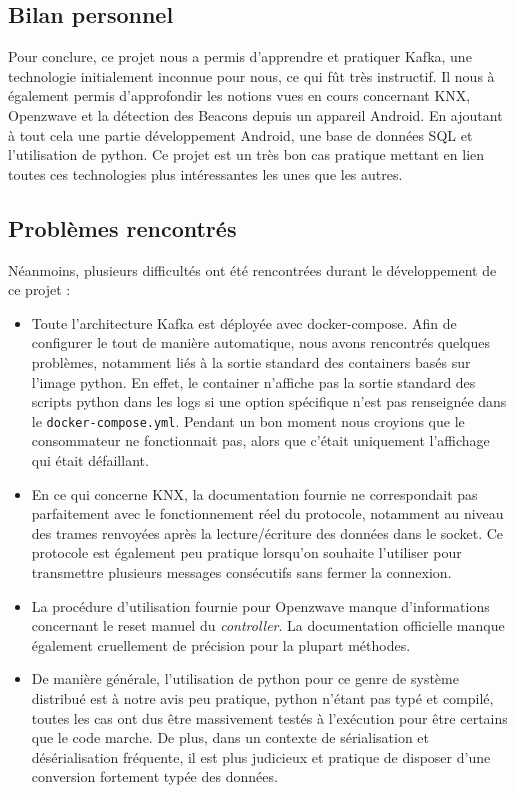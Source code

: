 \subsection{Bilan personnel}
Pour conclure, ce projet nous a permis d'apprendre et pratiquer Kafka, une technologie initialement inconnue pour nous, ce qui fût très instructif. Il nous à également permis d'approfondir les notions vues en cours concernant KNX, Openzwave et la détection des Beacons depuis un appareil Android. En ajoutant à tout cela une partie développement Android, une base de données SQL et l'utilisation de python. Ce projet est un très bon cas pratique mettant en lien toutes ces technologies plus intéressantes les unes que les autres.

\subsection{Problèmes rencontrés}
Néanmoins, plusieurs difficultés ont été rencontrées durant le développement de ce projet :
\begin{itemize}
    \item Toute l'architecture Kafka est déployée avec docker-compose. Afin de configurer le tout de manière automatique, nous avons rencontrés quelques problèmes, notamment liés à la sortie standard des containers basés sur l'image python. En effet, le container n'affiche pas la sortie standard des scripts python dans les logs si une option spécifique n'est pas renseignée dans le \texttt{docker-compose.yml}. Pendant un bon moment nous croyions que le consommateur ne fonctionnait pas, alors que c'était uniquement l'affichage qui était défaillant.
    \item En ce qui concerne KNX, la documentation fournie ne correspondait pas parfaitement avec le fonctionnement réel du protocole, notamment au niveau des trames renvoyées après la lecture/écriture des données dans le socket. Ce protocole est également peu pratique lorsqu'on souhaite l'utiliser pour transmettre plusieurs messages consécutifs sans fermer la connexion.
    \item La procédure d'utilisation fournie pour Openzwave manque d'informations concernant le reset manuel du \textit{controller}. La documentation officielle manque également cruellement de précision pour la plupart méthodes.
    \item De manière générale, l'utilisation de python pour ce genre de système distribué est à notre avis peu pratique, python n'étant pas typé et compilé, toutes les cas ont dus être massivement testés à l'exécution pour être certains que le code marche. De plus, dans un contexte de sérialisation et désérialisation fréquente, il est plus judicieux et pratique de disposer d'une conversion fortement typée des données.
\end{itemize}

